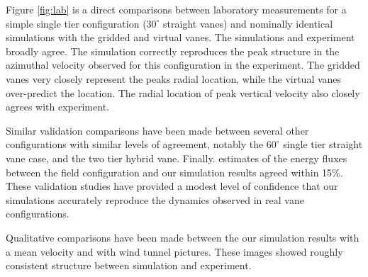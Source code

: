Figure \ref{fig:lab} is a direct comparisons between laboratory measurements for a simple 
single tier configuration ($30^{\circ}$ straight vanes) and 
nominally identical simulations with the gridded and virtual vanes. The simulations 
and experiment broadly agree. 
The simulation correctly reproduces the peak structure in
the azimuthal velocity observed for this configuration in the
experiment. The gridded vanes very closely represent the peaks radial location, 
while the virtual vanes over-predict the location. 
The radial location of peak vertical velocity also closely
agrees with experiment.

Similar validation comparisons have been made between several other
configurations with similar levels of agreement, 
notably the $60^{\circ}$ single tier
straight vane case, and the two tier hybrid vane. 
Finally. estimates of the energy fluxes between the field
configuration and our simulation results agreed within 15\%. These
validation studies have provided a modest level of confidence that our
simulations accurately reproduce the dynamics observed in real vane
configurations.

Qualitative comparisons have been made between the our simulation results with a
mean velocity and with wind tunnel pictures. These images showed roughly
consistent structure between simulation and
experiment. 

%
% 
%
% 
%
%
%
%
